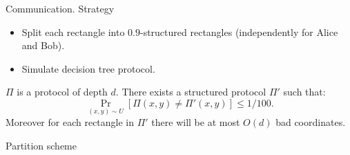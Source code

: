 \begin{frame}{Communication. Strategy}

    \begin{itemize}
        \item Split each rectangle into $0.9$-structured rectangles
            (independently for Alice and Bob).
            \pause
        \item Simulate decision tree protocol.
    \end{itemize}

    \pause

    \begin{lemma}
        $\Pi$ is a protocol of depth $d$. There exists a
        structured protocol $\Pi'$ such that:
        $$
            \Pr_{(x, y) \sim U}[\Pi(x, y) \neq \Pi'(x, y)] \le 1 / 100.
        $$
        Moreover for each rectangle in $\Pi'$ there will be at most
        $O(d)$ bad coordinates.
    \end{lemma}

\end{frame}

\begin{frame}{Partition scheme}

    \begin{center}
        
    \end{center}
    
\end{frame}